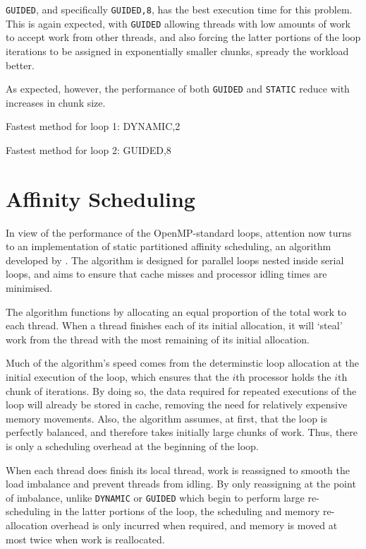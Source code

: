 \documentclass{article} %
\newcommand{\tp}{\texttt}
\begin{document}
\tp{GUIDED}, and specifically \tp{GUIDED,8}, has the best execution time for this problem. This is again expected, with \tp{GUIDED} allowing threads with low amounts of work to accept work from other threads, and also forcing the latter portions of the loop iterations to be assigned in exponentially smaller chunks, spready the workload better.

As expected, however, the performance of both \tp{GUIDED} and \tp{STATIC} reduce with increases in chunk size.

Fastest method for loop 1: DYNAMIC,2

Fastest method for loop 2: GUIDED,8


\section*{Affinity Scheduling}

In view of the performance of the OpenMP-standard loops, attention now turns to an implementation of static partitioned affinity scheduling, an algorithm developed by \citet{273046}.
The algorithm is designed for parallel loops nested inside serial loops, and aims to ensure that cache misses and processor idling times are minimised.

The algorithm functions by allocating an equal proportion of the total work to each thread. 
When a thread finishes each of its initial allocation, it will `steal' work from the thread with the most remaining of its initial allocation.

Much of the algorithm's speed comes from the determinstic loop allocation at the initial execution of the loop, which ensures that the $i$th processor holds the $i$th chunk of iterations.
By doing so, the data required for repeated executions of the loop will already be stored in cache, removing the need for relatively expensive memory movements.
Also, the algorithm assumes, at first, that the loop is perfectly balanced, and therefore takes initially large chunks of work.
Thus, there is only a scheduling overhead at the beginning of the loop.

When each thread does finish its local thread, work is reassigned to smooth the load imbalance and prevent threads from idling.
By only reassigning at the point of imbalance, unlike \tp{DYNAMIC} or \tp{GUIDED} which begin to perform large re-scheduling in the latter portions of the loop, the scheduling and memory re-allocation overhead is only incurred when required, and memory is moved at most twice when work is reallocated.
\end{document}
